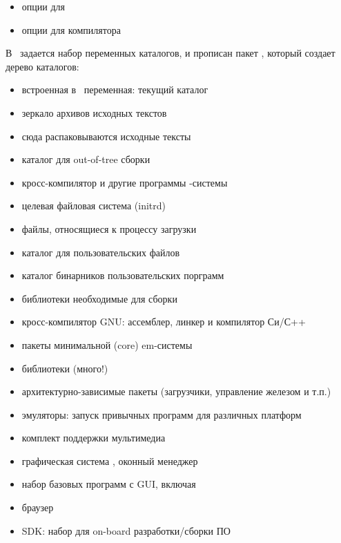 {\begin{itemize}
  \item{} опции для 
  \item{} опции для компилятора 
\end{itemize}





В \ задается набор переменных каталогов, и прописан пакет
, который создает дерево каталогов:

\begin{itemize}
  \item{} встроенная в \make\ переменная: текущий каталог
  \item{} зеркало архивов исходных текстов
  \item{} сюда распаковываются исходные тексты
  \item{} каталог для out-of-tree сборки
  \item{} кросс-компилятор и другие программы -системы
  \item{} целевая файловая система  (initrd)
  \item{} файлы, относящиеся к процессу загрузки
  \item{} каталог для пользовательских файлов
  \item{} каталог бинарников пользовательских порграмм
\end{itemize}



\begin{itemize}
  \item библиотеки необходимые для сборки 
  \item кросс-компилятор GNU: ассемблер, линкер и компилятор Си/С++
  \item пакеты минимальной (core) em\linux-системы
  \item библиотеки (много!)
  \item архитектурно-зависимые пакеты (загрузчики, управление железом и т.п.)
  \item эмуляторы: запуск привычных программ для различных платформ
  \item комплект поддержки мультимедиа
  \item графическая система , оконный менеджер
  \item набор базовых программ с GUI, включая
  \item браузер
  \item SDK: набор для on-board разработки/сборки ПО
\end{itemize}

}

